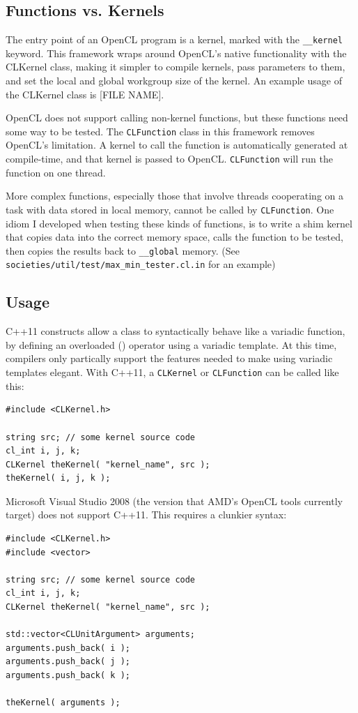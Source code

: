 \documentclass{article}
\begin{document}
\subsection{Functions vs. Kernels}
The entry point of an OpenCL program is a kernel, marked with the \texttt{\_\_kernel} keyword. This framework wraps around OpenCL's native functionality with the CLKernel class, making it simpler to compile kernels, pass parameters to them, and set the local and global workgroup size of the kernel. An example usage of the CLKernel class is [FILE NAME].

OpenCL does not support calling non-kernel functions, but these functions need some way to be tested. The \texttt{CLFunction} class in this framework removes OpenCL's limitation. A kernel to call the function is automatically generated at compile-time, and that kernel is passed to OpenCL. \texttt{CLFunction} will run the function on one thread.

More complex functions, especially those that involve threads cooperating on a task with data stored in local memory, cannot be called by \texttt{CLFunction}. One idiom I developed when testing these kinds of functions, is to write a shim kernel that copies data into the correct memory space, calls the function to be tested, then copies the results back to \texttt{\_\_global} memory. (See \texttt{societies/util/test/max\_min\_tester.cl.in} for an example)

\subsection{Usage}
C++11 constructs allow a class to syntactically behave like a variadic function, by defining an overloaded () operator using a variadic template. At this time, compilers only partically support the features needed to make using variadic templates elegant. With C++11, a \texttt{CLKernel} or \texttt{CLFunction} can be called like this:

\begin{lstlisting}
#include <CLKernel.h>

string src; // some kernel source code
cl_int i, j, k;
CLKernel theKernel( "kernel_name", src );
theKernel( i, j, k );
\end{lstlisting}

Microsoft Visual Studio 2008 (the version that AMD's OpenCL tools currently target) does not support C++11. This requires a clunkier syntax:

\begin{lstlisting}
#include <CLKernel.h>
#include <vector>

string src; // some kernel source code
cl_int i, j, k;
CLKernel theKernel( "kernel_name", src );

std::vector<CLUnitArgument> arguments;
arguments.push_back( i ); 
arguments.push_back( j ); 
arguments.push_back( k ); 

theKernel( arguments );
\end{lstlisting}
\end{document}
